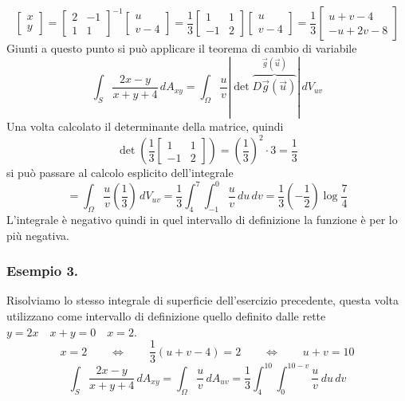 \documentclass[10pt]{article}
\theoremstyle{plain}
\theoremstyle{definition}
\begin{document}
$$\begin{bmatrix} x \\ y  \end{bmatrix} = \begin{bmatrix} 2 & -1 \\ 1 & 1  \end{bmatrix}^{-1} \begin{bmatrix} u \\ v-4 \end{bmatrix} = \frac{1}{3} \begin{bmatrix} 1 & 1 \\ -1 & 2  \end{bmatrix} \begin{bmatrix} u \\ v-4 \end{bmatrix} = \frac{1}{3} \begin{bmatrix} u+v-4 \\ -u +2v -8  \end{bmatrix}$$
Giunti a questo punto si può applicare il teorema di cambio di variabile
$$\int_S \frac{2x-y}{x+y+4} \,dA_{xy} = \int_{\Omega} \frac{u}{v} | \det \overbrace{D\vec{g}(\vec{u})}^{\vec{g}(\vec{u})}| \,dV_{uv} $$
Una volta calcolato il determinante della matrice, quindi
$$\det \left(\frac{1}{3} \begin{bmatrix} 1 & 1 \\ -1 & 2  \end{bmatrix}\right) = \left( \frac{1}{3}\right)^2 \cdot 3 = \frac{1}{3}$$
si può passare al calcolo esplicito dell'integrale
$$=\int_{\Omega} \frac{u}{v} \left(\frac{1}{3}\right) \,dV_{uv} = \frac{1}{3}\int_4^7\int_{-1}^0 \frac{u}{v}\,du\,dv = \frac{1}{3} \left( -\frac{1}{2}\right) \log \frac{7}{4}$$
L'integrale è negativo quindi in quel intervallo di definizione la funzione è per lo più negativa.
\\


\subsubsection{Esempio 3.}
Risolviamo lo stesso integrale di superficie dell'esercizio precedente, questa volta utilizzano come intervallo di definizione quello definito dalle rette \\ $y=2x \quad x+y=0 \quad x=2$.
$$x=2 \qquad \Leftrightarrow \qquad \frac{1}{3}(u+v-4) =2 \qquad \Leftrightarrow \qquad u+v=10$$
$$\int_S \frac{2x-y}{x+y+4} \,dA_{xy} = \int_{\Omega} \frac{u}{v}\,dA_{uv} = \frac{1}{3} \int_4^{10} \int_0^{10-v} \frac{u}{v} \,du\,dv$$
\end{document}
